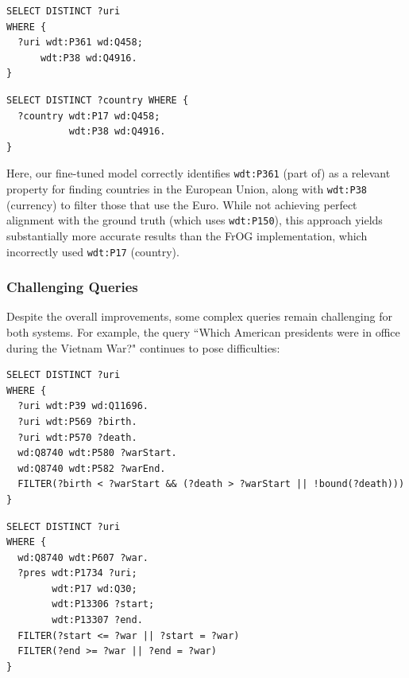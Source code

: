 \begin{lstlisting}[language=SPARQL, caption=Our Fine-tuned Model Output for EU Countries with Euro, label=code:eu-euro-finetuned]
SELECT DISTINCT ?uri
WHERE {
  ?uri wdt:P361 wd:Q458;
      wdt:P38 wd:Q4916.
}
\end{lstlisting}

\begin{lstlisting}[language=SPARQL, caption=FrOG Output for EU Countries with Euro, label=code:eu-euro-previous]
SELECT DISTINCT ?country WHERE {
  ?country wdt:P17 wd:Q458; 
           wdt:P38 wd:Q4916.
}
\end{lstlisting}

Here, our fine-tuned model correctly identifies \texttt{wdt:P361} (part of) as a relevant property for finding countries in the European Union, along with \texttt{wdt:P38} (currency) to filter those that use the Euro. While not achieving perfect alignment with the ground truth (which uses \texttt{wdt:P150}), this approach yields substantially more accurate results than the FrOG implementation, which incorrectly used \texttt{wdt:P17} (country).

\subsubsection{Challenging Queries}
Despite the overall improvements, some complex queries remain challenging for both systems. For example, the query ``Which American presidents were in office during the Vietnam War?" continues to pose difficulties:

\begin{lstlisting}[language=SPARQL, caption=Ground Truth Query for Vietnam War Presidents, label=code:vietnam-true]
SELECT DISTINCT ?uri
WHERE {
  ?uri wdt:P39 wd:Q11696.
  ?uri wdt:P569 ?birth.
  ?uri wdt:P570 ?death.
  wd:Q8740 wdt:P580 ?warStart.
  wd:Q8740 wdt:P582 ?warEnd.
  FILTER(?birth < ?warStart && (?death > ?warStart || !bound(?death)))
}
\end{lstlisting}

\begin{lstlisting}[language=SPARQL, caption=Our Fine-tuned Model Output for Vietnam War Presidents, label=code:vietnam-finetuned]
SELECT DISTINCT ?uri
WHERE {
  wd:Q8740 wdt:P607 ?war.
  ?pres wdt:P1734 ?uri; 
        wdt:P17 wd:Q30; 
        wdt:P13306 ?start; 
        wdt:P13307 ?end.
  FILTER(?start <= ?war || ?start = ?war)
  FILTER(?end >= ?war || ?end = ?war)
}
\end{lstlisting}

